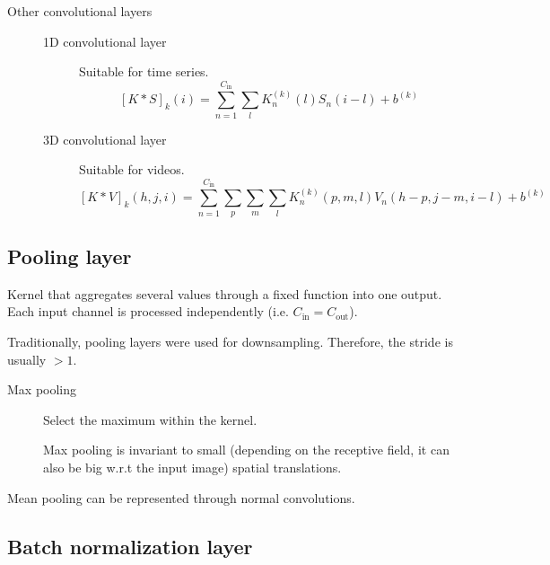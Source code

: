 \begin{description}
    \item[Other convolutional layers]
        \phantom{}
        \begin{description}
            \item[1D convolutional layer] 
                Suitable for time series.
                \[
                    [K * S]_k(i) = \sum_{n=1}^{C_\text{in}} \sum_{l} K_n^{(k)}(l) S_n(i-l) + b^{(k)}
                \]

            \item[3D convolutional layer] 
                Suitable for videos.
                \[
                    [K * V]_k(h, j, i) = \sum_{n=1}^{C_\text{in}} \sum_{p} \sum_{m} \sum_{l} K_n^{(k)}(p, m, l) V_n(h-p, j-m, i-l) + b^{(k)}
                \]
        \end{description}
\end{description}


\subsection{Pooling layer}

Kernel that aggregates several values through a fixed function into one output.
Each input channel is processed independently (i.e. $C_\text{in} = C_\text{out}$).

\begin{remark}
    Traditionally, pooling layers were used for downsampling. Therefore, the stride is usually $> 1$.
\end{remark}

\begin{description}
    \item[Max pooling] 
        Select the maximum within the kernel.

        \begin{remark}
            Max pooling is invariant to small (depending on the receptive field, it can also be big w.r.t the input image) spatial translations.
        \end{remark}
\end{description}

\begin{remark}
    Mean pooling can be represented through normal convolutions.
\end{remark}


\subsection{Batch normalization layer}

